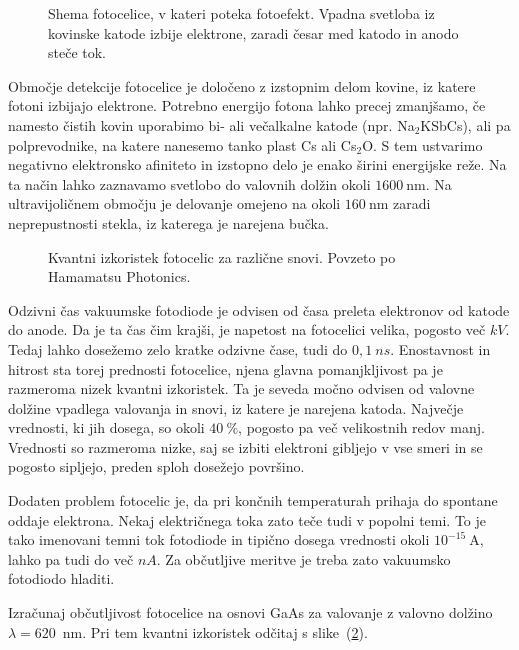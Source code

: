 \begin{figure}[h]
\centering
\def\svgwidth{60truemm} 

\caption{Shema fotocelice, v kateri poteka fotoefekt. 
Vpadna svetloba iz kovinske katode izbije elektrone, zaradi česar med katodo 
in anodo steče tok.}
\label{fig:Fotoefekt}
\end{figure}

Območje detekcije fotocelice je določeno z izstopnim delom kovine, iz katere fotoni izbijajo elektrone. 
Potrebno energijo fotona lahko precej zmanjšamo, če namesto čistih kovin uporabimo bi- ali 
večalkalne katode (npr. Na$_2$KSbCs), ali pa polprevodnike, na katere nanesemo tanko plast 
Cs ali Cs$_2$O. S tem ustvarimo negativno elektronsko afiniteto in 
izstopno delo je enako širini energijske
reže. Na ta način lahko zaznavamo svetlobo do valovnih dolžin okoli $1600~\si{\nano\metre}$. 
Na ultravijoličnem območju je delovanje
omejeno na okoli $160~\si{\nano\metre}$ zaradi neprepustnosti stekla, 
iz katerega je narejena bučka.
\begin{figure}[h]
\centering
\def\svgwidth{130truemm} 

\caption{Kvantni izkoristek fotocelic za različne snovi. Povzeto po Hamamatsu Photonics.}
\label{fig:Fotodioda}
\end{figure}

Odzivni čas vakuumske fotodiode je odvisen od časa preleta elektronov od katode do anode. 
Da je ta čas čim krajši, je napetost na fotocelici velika, pogosto več $\si{kV}$. 
Tedaj lahko dosežemo zelo kratke odzivne čase, tudi do $0,1~\si{ns}$. 
Enostavnost in hitrost sta torej prednosti fotocelice, 
njena glavna pomanjkljivost pa je razmeroma nizek kvantni izkoristek. 
Ta je seveda močno odvisen od valovne dolžine vpadlega valovanja in snovi, iz 
katere je narejena katoda. Največje vrednosti, ki jih dosega, so okoli $40~\%$, 
pogosto pa več velikostnih redov manj. 
Vrednosti so razmeroma nizke, saj se izbiti elektroni gibljejo v vse
smeri in se pogosto sipljejo, preden sploh dosežejo površino. 

Dodaten problem fotocelic je, da pri končnih temperaturah prihaja do spontane oddaje elektrona.
Nekaj električnega toka zato teče tudi v popolni temi. To je tako imenovani temni 
tok fotodiode 
in tipično dosega vrednosti okoli $10^{-15}~\si{\ampere}$, lahko pa tudi do več $\si{nA}$. 
Za občutljive meritve je treba zato vakuumsko fotodiodo hladiti. 

\vskip1cm
\begin{definition}
Izračunaj občutljivost fotocelice na osnovi GaAs 
za valovanje z valovno dolžino $\lambda=620$~nm.
Pri tem kvantni izkoristek odčitaj s slike~(\ref{fig:Fotodioda}).
\end{definition}

